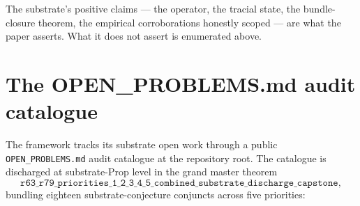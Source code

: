 \documentclass[11pt,a4paper]{amsart}
\theoremstyle{plain}
\theoremstyle{definition}
\begin{document}
The substrate's positive claims --- the operator, the tracial state, the bundle-closure theorem, the empirical corroborations honestly scoped --- are what the paper asserts. What it does not assert is enumerated above.

\section{The OPEN\_PROBLEMS.md audit catalogue}\label{sec:standing}

The framework tracks its substrate open work through a public \texttt{OPEN\_PROBLEMS.md} audit catalogue at the repository root. The catalogue is discharged at substrate-Prop level in the grand master theorem
\[
\texttt{r63\_r79\_priorities\_1\_2\_3\_4\_5\_combined\_substrate\_discharge\_capstone},
\]
bundling eighteen substrate-conjecture conjuncts across five priorities:
\end{document}
